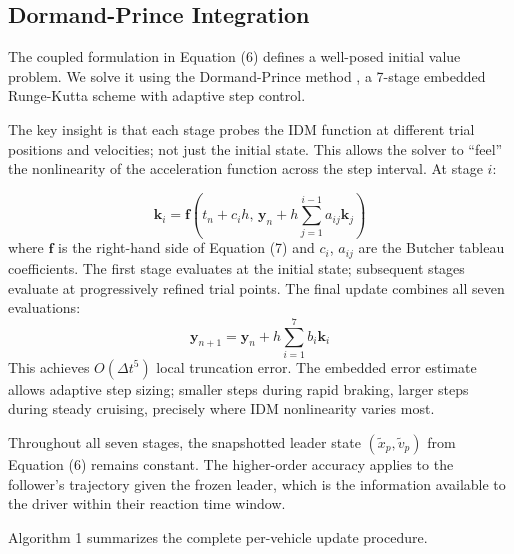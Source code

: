 \documentclass{scspaperproc}
\theoremstyle{scsthe}
\begin{document}
    \subsection{Dormand-Prince Integration}
    The coupled formulation in Equation (6) defines a well-posed initial value problem. We solve it using the Dormand-Prince method \cite{dormand1980family}, a 7-stage embedded Runge-Kutta scheme with adaptive step control.

    The key insight is that each stage probes the IDM function at different trial positions and velocities; not just the initial state. This allows the solver to ``feel'' the nonlinearity of the acceleration function across the step interval. At stage $i$:

    \begin{equation}
        \mathbf{k}_i = \mathbf{f}\left( t_n + c_i h, \, \mathbf{y}_n + h \sum_{j=1}^{i-1} a_{ij} \mathbf{k}_j \right)
    \end{equation}
    where $\mathbf{f}$ is the right-hand side of Equation (7) and $c_i$, $a_{ij}$ are the Butcher tableau coefficients. The first stage evaluates at the initial state; subsequent stages evaluate at progressively refined trial points. The final update combines all seven evaluations:
    \begin{equation}
        \mathbf{y}_{n+1} = \mathbf{y}_n + h \sum_{i=1}^{7} b_i \mathbf{k}_i
    \end{equation}
    This achieves $O(\Delta t^5)$ local truncation error. The embedded error estimate allows adaptive step sizing; smaller steps during rapid braking, larger steps during steady cruising, precisely where IDM nonlinearity varies most.

    Throughout all seven stages, the snapshotted leader state $(\tilde{x}_p, \tilde{v}_p)$ from Equation (6) remains constant. The higher-order accuracy applies to the follower's trajectory given the frozen leader, which is the information available to the driver within their reaction time window.

    Algorithm 1 summarizes the complete per-vehicle update procedure.
\end{document}
